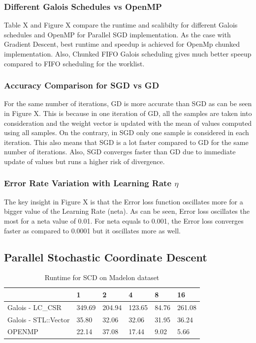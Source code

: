\documentclass{sigplanconf}
\begin{document}
{	\subsubsection{Different Galois Schedules vs OpenMP}
	Table X and Figure X compare the runtime and scalibilty for different Galois schedules and OpenMP for Parallel SGD
	implementation. As the case with Gradient Descent, best runtime and speedup is achieved for OpenMp chunked implementation.
	Also, Chunked FIFO Galois scheduling gives much better speeup compared to FIFO scheduling for the worklist.
	
	\subsubsection{Accuracy Comparison for SGD vs GD}
	For the same number of iterations, GD is more accurate than SGD as can be seen in Figure X. This is because in one iteration
	of GD, all the samples are taken into consideration and the weight vector is updated with the mean of values computed using all
	samples. On the contrary, in SGD only one sample is considered in each iteration. This also means that SGD is a lot faster compared
	to GD for the same number of iterations. Also, SGD converges faster than GD due to immediate update of values but runs a higher
	risk of divergence.

	\subsubsection{Error Rate Variation with Learning Rate \(\eta\) }
	The key insight in Figure X is that the Error loss function oscillates more for a bigger value of the Learning Rate (neta).
	As can be seen, Error loss oscillates the most for a neta value of 0.01. For neta equals to 0.001, the Error loss converges faster
	as compared to 0.0001 but it oscillates more as well.

\subsection{Parallel Stochastic Coordinate Descent}
\begin{table}[htbp]
\caption{Runtime for SCD on Madelon dataset}
\begin{tabular}{|p{7em}|p{2.5em}|p{2.5em}|p{2.5em}|p{2em}|p{2.5em}|}
\hline
 & 1 & 2 & 4 & 8 & 16 \\ \hline
Galois - LC\_CSR & 349.69 & 204.94 & 123.65 & 84.76 & 261.08 \\ \hline
Galois - STL::Vector  & 35.80 & 32.06 & 32.06 & 31.95 & 36.24 \\ \hline
OPENMP & 22.14 & 37.08 & 17.44 & 9.02 & 5.66 \\ \hline
\end{tabular}
\label{Label of the table}
\end{table}

}
\end{document}

